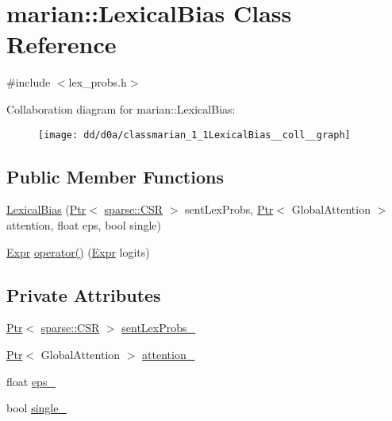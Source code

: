 \hypertarget{classmarian_1_1LexicalBias}{}\section{marian\+:\+:Lexical\+Bias Class Reference}
\label{classmarian_1_1LexicalBias}


{\ttfamily \#include $<$lex\+\_\+probs.\+h$>$}



Collaboration diagram for marian\+:\+:Lexical\+Bias\+:
\nopagebreak
\begin{figure}[H]
\begin{center}
\leavevmode
\texttt{[image: dd/d0a/classmarian\_1\_1LexicalBias\_\_coll\_\_graph]}
\end{center}
\end{figure}
\subsection*{Public Member Functions}
\begin{DoxyCompactItemize}
\item 
\hyperlink{classmarian_1_1LexicalBias_a2a1c2b9a00a85ee6620f80a5c8c40534}{Lexical\+Bias} (\hyperlink{namespacemarian_ad1a373be43a00ef9ce35666145137b08}{Ptr}$<$ \hyperlink{classmarian_1_1sparse_1_1CSR}{sparse\+::\+C\+SR} $>$ sent\+Lex\+Probs, \hyperlink{namespacemarian_ad1a373be43a00ef9ce35666145137b08}{Ptr}$<$ Global\+Attention $>$ attention, float eps, bool single)
\item 
\hyperlink{namespacemarian_a498d8baf75b754011078b890b39c8e12}{Expr} \hyperlink{classmarian_1_1LexicalBias_ab5d432af32715db16e5a51b29c36aed9}{operator()} (\hyperlink{namespacemarian_a498d8baf75b754011078b890b39c8e12}{Expr} logits)
\end{DoxyCompactItemize}
\subsection*{Private Attributes}
\begin{DoxyCompactItemize}
\item 
\hyperlink{namespacemarian_ad1a373be43a00ef9ce35666145137b08}{Ptr}$<$ \hyperlink{classmarian_1_1sparse_1_1CSR}{sparse\+::\+C\+SR} $>$ \hyperlink{classmarian_1_1LexicalBias_a88bd39c6ff99b3f8414ae93ca12ac520}{sent\+Lex\+Probs\+\_\+}
\item 
\hyperlink{namespacemarian_ad1a373be43a00ef9ce35666145137b08}{Ptr}$<$ Global\+Attention $>$ \hyperlink{classmarian_1_1LexicalBias_a4f114151f82741483009c37e250eed2a}{attention\+\_\+}
\item 
float \hyperlink{classmarian_1_1LexicalBias_a326493e5dcc773e702d9f29d0da0c0e5}{eps\+\_\+}
\item 
bool \hyperlink{classmarian_1_1LexicalBias_aff01be8467b5f74284af2f620dfefac5}{single\+\_\+}
\end{DoxyCompactItemize}


